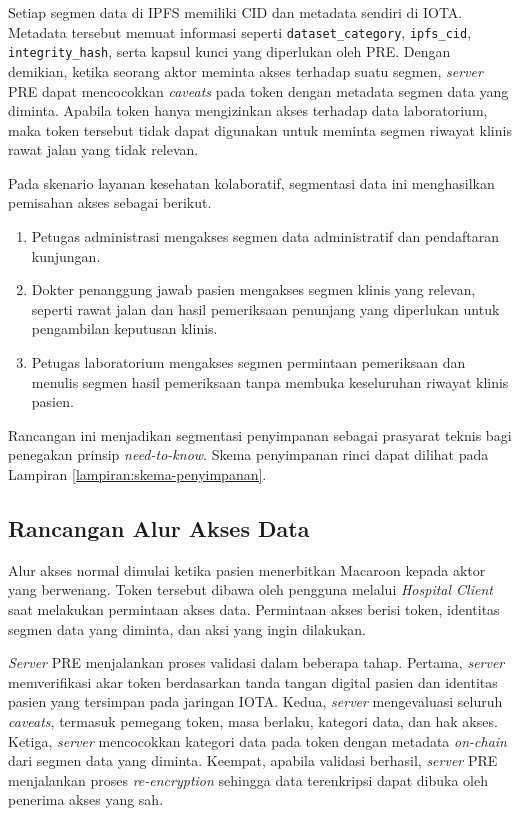 Setiap segmen data di IPFS memiliki CID dan metadata sendiri di IOTA. Metadata tersebut memuat informasi seperti \texttt{dataset\_category}, \texttt{ipfs\_cid}, \texttt{integrity\_hash}, serta kapsul kunci yang diperlukan oleh PRE. Dengan demikian, ketika seorang aktor meminta akses terhadap suatu segmen, \textit{server} PRE dapat mencocokkan \textit{caveats} pada token dengan metadata segmen data yang diminta. Apabila token hanya mengizinkan akses terhadap data laboratorium, maka token tersebut tidak dapat digunakan untuk meminta segmen riwayat klinis rawat jalan yang tidak relevan.

Pada skenario layanan kesehatan kolaboratif, segmentasi data ini menghasilkan pemisahan akses sebagai berikut.

\begin{enumerate}[leftmargin=*]
	\item Petugas administrasi mengakses segmen data administratif dan pendaftaran kunjungan.
	\item Dokter penanggung jawab pasien mengakses segmen klinis yang relevan, seperti rawat jalan dan hasil pemeriksaan penunjang yang diperlukan untuk pengambilan keputusan klinis.
	\item Petugas laboratorium mengakses segmen permintaan pemeriksaan dan menulis segmen hasil pemeriksaan tanpa membuka keseluruhan riwayat klinis pasien.
\end{enumerate}

Rancangan ini menjadikan segmentasi penyimpanan sebagai prasyarat teknis bagi penegakan prinsip \textit{need-to-know}. Skema penyimpanan rinci dapat dilihat pada Lampiran \ref{lampiran:skema-penyimpanan}.

\subsection{Rancangan Alur Akses Data}
\label{subsec:rancangan-alur-akses-data}

Alur akses normal dimulai ketika pasien menerbitkan Macaroon kepada aktor yang berwenang. Token tersebut dibawa oleh pengguna melalui \textit{Hospital Client} saat melakukan permintaan akses data. Permintaan akses berisi token, identitas segmen data yang diminta, dan aksi yang ingin dilakukan.

\textit{Server} PRE menjalankan proses validasi dalam beberapa tahap. Pertama, \textit{server} memverifikasi akar token berdasarkan tanda tangan digital pasien dan identitas pasien yang tersimpan pada jaringan IOTA. Kedua, \textit{server} mengevaluasi seluruh \textit{caveats}, termasuk pemegang token, masa berlaku, kategori data, dan hak akses. Ketiga, \textit{server} mencocokkan kategori data pada token dengan metadata \textit{on-chain} dari segmen data yang diminta. Keempat, apabila validasi berhasil, \textit{server} PRE menjalankan proses \textit{re-encryption} sehingga data terenkripsi dapat dibuka oleh penerima akses yang sah.

